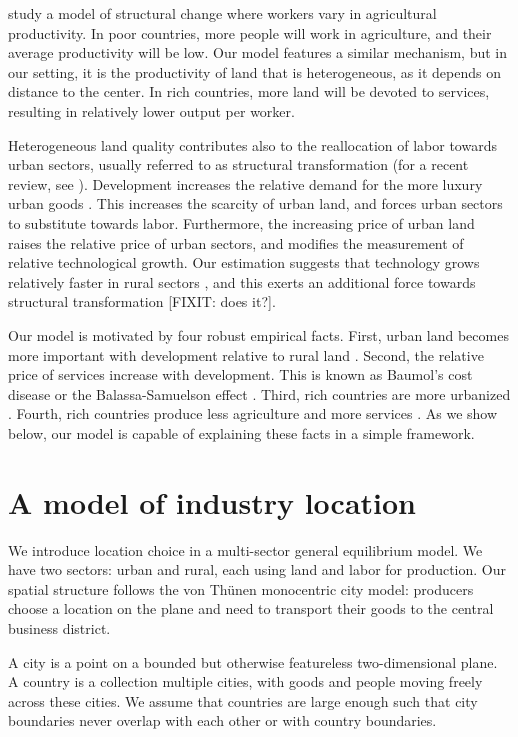\documentclass[12pt]{article}
\begin{document}
 study a model of structural change where workers vary in agricultural productivity. In poor countries, more people will work in agriculture, and their average productivity will be low. Our model features a similar mechanism, but in our setting, it is the productivity of land that is heterogeneous, as it depends on distance to the center. In rich countries, more land will be devoted to services, resulting in relatively lower output per worker.

Heterogeneous land quality contributes also to the reallocation of labor towards urban sectors, usually referred to as structural transformation (for a recent review, see ). Development increases the relative demand for the more luxury urban goods \cite{Echevarria97,Kongsamut01,Gollin02}. This increases the scarcity of urban land, and forces urban sectors to substitute towards labor. Furthermore, the increasing price of urban land raises the relative price of urban sectors, and modifies the measurement of relative technological growth. Our estimation suggests that technology grows relatively faster in rural sectors \cite{Ngai07,Restuccia08}, and this exerts an additional force towards structural transformation [FIXIT: does it?].

Our model is motivated by four robust empirical facts. First, urban land becomes more important with development relative to rural land \cite[Figure 10.3]{Clark}. Second, the relative price of services increase with development. This is known as Baumol's cost disease \cite{Baumol65} or the Balassa-Samuelson effect \cite{Balassa64,Samuelson64}. Third, rich countries are more urbanized \cite{United_Nations2014-zm}. Fourth, rich countries produce less agriculture and more services \cite{Kuznets1973,Ngai2007,Kongsamut01}. As we show below, our model is capable of explaining these facts in a simple framework.


\section{A model of industry location}
We introduce location choice in a multi-sector general equilibrium model. We have two sectors: urban and rural, each using land and labor for production. Our spatial structure follows the von Thünen monocentric city model: producers choose a location on the plane and need to transport their goods to the central business district.

A city is a point on a bounded but otherwise featureless two-dimensional plane. A country is a collection multiple cities, with goods and people moving freely across these cities. We assume that countries are large enough such that city boundaries never overlap with each other or with country boundaries.
\end{document}
